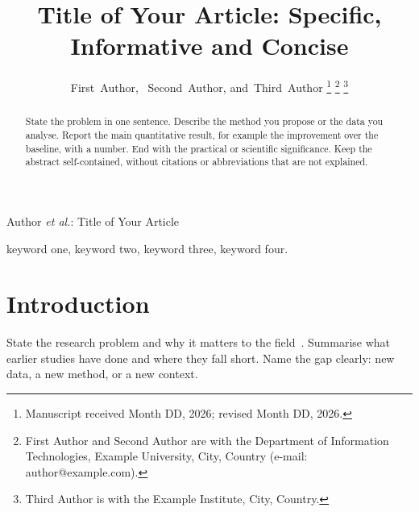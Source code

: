\documentclass[journal]{IEEEtran}
\begin{document}
\title{Title of Your Article: Specific, Informative and Concise}

\author{First~Author,~
        Second~Author,
        and~Third~Author%
\thanks{Manuscript received Month DD, 2026; revised Month DD, 2026.}%
\thanks{First Author and Second Author are with the Department of Information Technologies, Example University, City, Country (e-mail: author@example.com).}%
\thanks{Third Author is with the Example Institute, City, Country.}}

%
{Author \MakeLowercase{\textit{et al.}}: Title of Your Article}

\maketitle

\begin{abstract}
State the problem in one sentence. Describe the method you propose or the data you analyse. Report the main quantitative result, for example the improvement over the baseline, with a number. End with the practical or scientific significance. Keep the abstract self-contained, without citations or abbreviations that are not explained.
\end{abstract}

\begin{IEEEkeywords}
keyword one, keyword two, keyword three, keyword four.
\end{IEEEkeywords}

\IEEEpeerreviewmaketitle

\section{Introduction}
State the research problem and why it matters to the field~\cite{he2016resnet,redmon2016yolo}. Summarise what earlier studies have done and where they fall short. Name the gap clearly: new data, a new method, or a new context.
\end{document}
